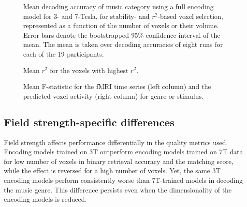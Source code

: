 \begin{figure}
  \centering
  \def\svgwidth{\linewidth}
  
	
  \caption{  Mean decoding accuracy of music category using a full encoding
	  model for 3- and 7-Tesla, for stability- and
  $r^2$-based voxel selection, represented as a function of the number of voxels
  or their volume. Error bars denote the bootstrapped 95\%
  confidence interval of the mean. The mean is taken over decoding
  accuracies of eight runs for each of the 19 participants.
 }

 \label{fig:decoding_full}
\end{figure}

\begin{figure}
  \centering
  \def\svgwidth{\linewidth}
  
	
  \caption{ Mean $r^2$ for the voxels with highest $r^2$.}

 \label{fig:r2}
\end{figure}

\begin{figure}
  \centering
  \def\svgwidth{\linewidth}
  
	
  \caption{ Mean F-statistic for the f{MRI} time series (left column) and the
  predicted voxel activity (right column) for genre or stimulus.
  }

 \label{fig:anova}
\end{figure}

\subsection*{Field strength-specific differences}

Field strength affects performance differentially in the quality
metrics used.
Encoding models trained on 3T outperform encoding models trained on 7T data for
low number of voxels in binary retrieval accuracy and the matching score, while
the effect is reversed for a  high number of voxels. Yet, the same 3T encoding models
perform consistently worse than 7T-trained models in decoding the music genre.
This difference persists even when the dimensionality of the encoding models is
reduced. 

